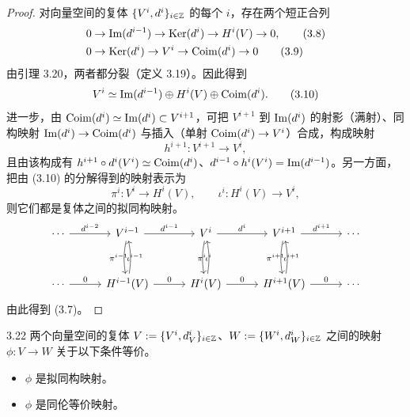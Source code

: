 \begin{proof}
对向量空间的复体 $\{V^i,d^i\}_{i\in\mathbb{Z}}$ 的每个 $i$，存在两个短正合列
\begin{align}
0&\to\operatorname{Im}(d^{i-1})\to\operatorname{Ker}(d^i)\to H^i(V)\to 0, \tag{3.8}\\
0&\to\operatorname{Ker}(d^i)\to V^i\to\operatorname{Coim}(d^i)\to 0 \tag{3.9}
\end{align}
由引理 3.20，两者都分裂（定义 3.19）。因此得到
\begin{equation}
V^i\simeq\operatorname{Im}(d^{i-1})\oplus H^i(V)\oplus\operatorname{Coim}(d^i). \tag{3.10}
\end{equation}
进一步，由 $\operatorname{Coim}(d^i)\simeq\operatorname{Im}(d^i)\subset V^{i+1}$，可把 $V^{i+1}$ 到 $\operatorname{Im}(d^i)$ 的射影（满射）、同构映射 $\operatorname{Im}(d^i)\to\operatorname{Coim}(d^i)$ 与插入（单射 $\operatorname{Coim}(d^i)\to V^i$）合成，构成映射
\[
h^{i+1}\colon V^{i+1}\to V^i,
\]
且由该构成有 $h^{i+1}\circ d^i(V^i)\simeq\operatorname{Coim}(d^i)$、$d^{i-1}\circ h^i(V^i)=\operatorname{Im}(d^{i-1})$。另一方面，把由 (3.10) 的分解得到的映射表示为
\[
\pi^i\colon V^i\to H^i(V),\qquad \iota^i\colon H^i(V)\to V^i,
\]
则它们都是复体之间的拟同构映射。
\[
\begin{tikzcd}[row sep=3.0em, column sep=2.9em]
\cdots \arrow[r,"d^{i-2}"] & V^{i-1} \arrow[r,"d^{i-1}"] \arrow[d,bend right=10,"\iota^{i-1}"] & V^i \arrow[r,"d^i"] \arrow[d,bend right=10,"\iota^i"] & V^{i+1} \arrow[r,"d^{i+1}"] \arrow[d,bend right=10,"\iota^{i+1}"] & \cdots \\
\cdots \arrow[r,"0"] & H^{i-1}(V) \arrow[r,"0"] \arrow[u,bend right=10,"\pi^{i-1}"] & H^i(V) \arrow[r,"0"] \arrow[u,bend right=10,"\pi^i"] & H^{i+1}(V) \arrow[r,"0"] \arrow[u,bend right=10,"\pi^{i+1}"] & \cdots
\end{tikzcd}
\]
由此得到 (3.7)。
\end{proof}


\begin{proposition}{3.22}
两个向量空间的复体 $V:=\{V^i,d_V^i\}_{i\in\mathbb{Z}}$、$W:=\{W^i,d_W^i\}_{i\in\mathbb{Z}}$ 之间的映射 $\phi\colon V\to W$ 关于以下条件等价。
\begin{itemize}
\item $\phi$ 是拟同构映射。
\item $\phi$ 是同伦等价映射。
\end{itemize}
\end{proposition}

